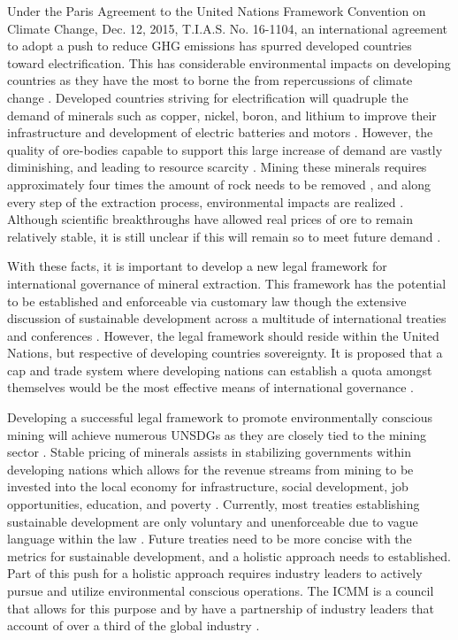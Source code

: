 \documentclass[12pt]{article}
\begin{document}
Under the Paris Agreement to the United Nations Framework Convention on Climate Change, Dec. 12, 2015, T.I.A.S. No. 16-1104, an international agreement to adopt a push to reduce GHG emissions has spurred developed countries toward electrification. This has considerable environmental impacts on developing countries as they have the most to borne the from repercussions of climate change \cite{Report:IEA_Executive_Summary}. Developed countries striving for electrification will quadruple the demand of minerals such as copper, nickel, boron, and lithium \cite{Report:IEA_Executive_Summary, News:Environmental_Regulation} to improve their infrastructure and development of electric batteries and motors \cite{Report:IEA_Executive_Summary}. However, the quality of ore-bodies capable to support this large increase of demand are vastly diminishing, and leading to resource scarcity \cite{Book:Governance_Resources, Book:Metal_Recycling, Report:IEA_Executive_Summary, News:Environmental_Regulation}. Mining these minerals requires approximately four times the amount of rock needs to be removed \cite{Article:Mining_Industry}, and along every step of the extraction process, environmental impacts are realized \cite{Article:Mining_Industry}. Although scientific breakthroughs have allowed real prices of ore to remain relatively stable, it is still unclear if this will remain so to meet future demand \cite{Book:Governance_Resources}.

With these facts, it is important to develop a new legal framework for international governance of mineral extraction. This framework has the potential to be established and enforceable via customary law though the extensive discussion of sustainable development across a multitude of international treaties and conferences \cite{Article:Development_International_Law}. However, the legal framework should reside within the United Nations, but respective of developing countries sovereignty. It is proposed that a cap and trade system where developing nations can establish a quota amongst themselves would be the most effective means of international governance \cite{Book:Governance_Resources}. 

Developing a successful legal framework to promote environmentally conscious mining will achieve numerous UNSDGs as they are closely tied to the mining sector \cite{Book:MRG_Sustainable_Report}. Stable pricing of minerals assists in stabilizing governments within developing nations which allows for the revenue streams from mining to be invested into the local economy for infrastructure, social development, job opportunities, education, and poverty \cite{Book:Governance_Resources}. Currently, most treaties establishing sustainable development are only voluntary and unenforceable due to vague language within the law \cite{Article:Development_International_Law}. Future treaties need to be more concise with the metrics for sustainable development, and a holistic approach needs to established. Part of this push for a holistic approach requires industry leaders to actively pursue and utilize environmental conscious operations. The ICMM is a council that allows for this purpose and by have a partnership of industry leaders that account of over a third of the global industry \cite{Website:ICMM}. 

\newpage
\printbibliography
\end{document}

